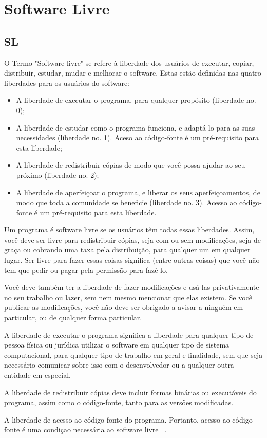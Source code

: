 \chapter{Software Livre}
\label{cap-software-livre}

\section{SL}

%
O Termo "Software livre" se refere à liberdade dos usuários de executar, copiar, distribuir, estudar, mudar e melhorar o software. Estas estão definidas nas quatro liberdades para os usuários do software:

\begin{itemize}
\item A liberdade de executar o programa, para qualquer propósito (liberdade no. 0);
\item A liberdade de estudar como o programa funciona, e adaptá-lo para as suas necessidades (liberdade no. 1). Aceso ao código-fonte é um pré-requisito para esta liberdade;
\item A liberdade de redistribuir cópias de modo que você possa ajudar ao seu próximo (liberdade no. 2);
\item A liberdade de aperfeiçoar o programa, e liberar os seus aperfeiçoamentos, de modo que toda a comunidade se beneficie (liberdade no. 3). Acesso ao código-fonte é um pré-requisito para esta liberdade.
\end{itemize}

Um programa é software livre se os usuários têm todas essas liberdades. Assim, você deve ser livre para redistribuir cópias, seja com ou sem modificações, seja de graça ou cobrando uma taxa pela distribuição, para qualquer um em qualquer lugar. Ser livre para fazer essas coisas significa (entre outras coisas) que você não tem que pedir ou pagar pela permissão para fazê-lo.

Você deve também ter a liberdade de fazer modificações e usá-las privativamente no seu trabalho ou lazer, sem nem mesmo mencionar que elas existem. Se você publicar as modificações, você não deve ser obrigado a avisar a ninguém em particular, ou de qualquer forma particular.

A liberdade de executar o programa significa a liberdade para qualquer tipo de pessoa física ou jurídica utilizar o software em qualquer tipo de sistema computacional, para qualquer tipo de trabalho em geral e finalidade, sem que seja necessário comunicar sobre isso com o desenvolvedor ou a qualquer outra entidade em especial.

A liberdade de redistribuir cópias deve incluir formas binárias ou executáveis do programa, assim como o código-fonte, tanto para as versões modificadas.

A liberdade de acesso ao código-fonte do programa. Portanto, acesso ao código-fonte é uma condiçao necessária ao software livre ~\cite{}.%